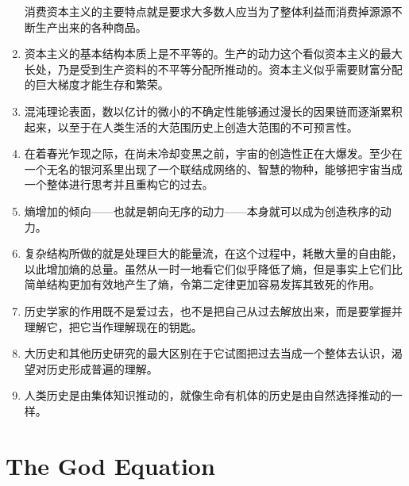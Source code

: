 \documentclass[UTF8]{ctexart}
\begin{document}
\begin{enumerate}
			消费资本主义的主要特点就是要求大多数人应当为了整体利益而消费掉源源不断生产出来的各种商品。
			
			\item 资本主义的基本结构本质上是不平等的。生产的动力这个看似资本主义的最大长处，乃是受到生产资料的不平等分配所推动的。资本主义似乎需要财富分配的巨大梯度才能生存和繁荣。
			
			\item 混沌理论表面，数以亿计的微小的不确定性能够通过漫长的因果链而逐渐累积起来，以至于在人类生活的大范围历史上创造大范围的不可预言性。
			\item 在着春光乍现之际，在尚未冷却变黑之前，宇宙的创造性正在大爆发。至少在一个无名的银河系里出现了一个联结成网络的、智慧的物种，能够把宇宙当成一个整体进行思考并且重构它的过去。
			\item 熵增加的倾向——也就是朝向无序的动力——本身就可以成为创造秩序的动力。
			\item 复杂结构所做的就是处理巨大的能量流，在这个过程中，耗散大量的自由能，以此增加熵的总量。虽然从一时一地看它们似乎降低了熵，但是事实上它们比简单结构更加有效地产生了熵，令第二定律更加容易发挥其致死的作用。
			\item 历史学家的作用既不是爱过去，也不是把自己从过去解放出来，而是要掌握并理解它，把它当作理解现在的钥匙。
			\item 大历史和其他历史研究的最大区别在于它试图把过去当成一个整体去认识，渴望对历史形成普遍的理解。
			\item 人类历史是由集体知识推动的，就像生命有机体的历史是由自然选择推动的一样。	 	
		\end{enumerate}
	\newpage
	
	\section{The God Equation}
		
\end{document}
